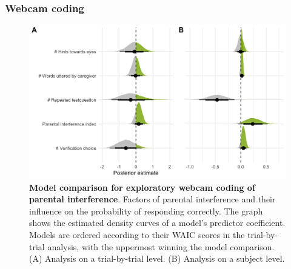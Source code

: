 \documentclass[
  man,floatsintext]{apa6}
\begin{document}
\hypertarget{webcam-coding}{%
\subsubsection{Webcam coding}\label{webcam-coding}}




\begin{figure}

{\centering \includegraphics[width=1\linewidth]{../figures/supplements_webcamcoding_draws} 

}

\caption{\textbf{Model comparison for exploratory webcam coding of parental interference}.
Factors of parental interference and their influence on the probability of responding correctly. The graph shows the estimated density curves of a model's predictor coefficient. Models are ordered according to their WAIC scores in the trial-by-trial analysis, with the uppermost winning the model comparison. (A) Analysis on a trial-by-trial level. (B) Analysis on a subject level.}\label{fig:fig5}
\end{figure}
\end{document}
